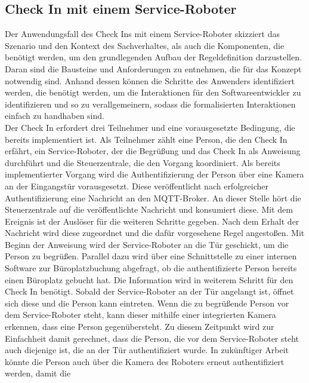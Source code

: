 \subsection{Check In mit einem Service-Roboter}
    Der Anwendungsfall des Check Ins mit einem Service-Roboter skizziert das Szenario und den Kontext des Sachverhaltes, als 
    auch die Komponenten, die benötigt werden, um den grundlegenden Aufbau der Regeldefinition darzustellen. Daran sind die 
    Bausteine und Anforderungen zu entnehmen, die für das Konzept notwendig sind. Anhand dessen können die Schritte des 
    Anwenders identifiziert werden, die benötigt werden, um die Interaktionen für den Softwareentwickler zu identifizieren 
    und so zu verallgemeinern, sodass die formalisierten Interaktionen einfach zu handhaben sind. 
    \\
    \linebreak
    Der Check In erfordert drei Teilnehmer und eine vorausgesetzte Bedingung, die bereits implementiert ist. Als Teilnehmer 
    zählt eine Person, die den Check In erfährt, ein Service-Roboter, der die Begrüßung und das Check In als Anweisung 
    durchführt und die Steuerzentrale, die den Vorgang koordiniert. Als bereits implementierter Vorgang wird die 
    Authentifizierung der Person über eine Kamera an der Eingangstür vorausgesetzt. Diese veröffentlicht nach erfolgreicher 
    Authentifizierung eine Nachricht an den \acs{MQTT}-Broker. An dieser Stelle hört die Steuerzentrale auf die 
    veröffentlichte Nachricht und konsumiert diese. Mit dem Ereignis ist der Auslöser für die weiteren Schritte gegeben. Nach 
    dem Erhalt der Nachricht wird diese zugeordnet und die dafür vorgesehene Regel angestoßen. Mit Beginn der Anweisung wird 
    der Service-Roboter an die Tür geschickt, um die Person zu begrüßen. Parallel dazu wird über eine Schnittstelle zu einer 
    internen Software zur Büroplatzbuchung abgefragt, ob die authentifizierte Person bereits einen Büroplatz gebucht hat. 
    Die Information wird in weiterem Schritt für den Check In benötigt. Sobald der Service-Roboter an der Tür angelangt ist, 
    öffnet sich diese und die Person kann eintreten. Wenn die zu begrüßende Person vor dem Service-Roboter steht, kann dieser 
    mithilfe einer integrierten Kamera erkennen, dass eine Person gegenübersteht. Zu diesem Zeitpunkt wird zur Einfachheit 
    damit gerechnet, dass die Person, die vor dem Service-Roboter steht auch diejenige ist, die an der Tür authentifiziert 
    wurde. In zukünftiger Arbeit könnte die Person auch über die Kamera des Roboters erneut authentifiziert werden, damit die 
